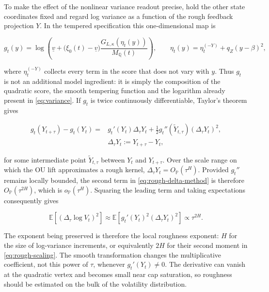 \documentclass[11pt,a4paper]{article}
\newcommand{\Pp}{\mathbb{P}}
\newcommand{\Qq}{\mathbb{Q}}
\newcommand{\E}{\mathbb{E}}
\begin{document}
To make the effect of the nonlinear variance readout precise, hold the other state coordinates
fixed and regard log variance as a function of the rough feedback projection \(Y\).  In the
tempered specification this one-dimensional map is

\begin{equation*}
g_t(y)
=\log\!\left(\underline v+
\bigl(\xi_0(t)-\underline v\bigr)
\frac{G_{L,\kappa}(\eta_t(y))}{M_{\Qq}(t)}\right),
\qquad
\eta_t(y)=\eta_t^{(-Y)}+q_Z(y-\beta)^2,
\end{equation*}

where \(\eta_t^{(-Y)}\) collects every term in the score that does not vary with \(y\).
Thus \(g_t\) is not an additional model ingredient: it is simply the composition of the
quadratic score, the smooth tempering function and the logarithm already present in
\cref{eq:variance}.  If \(g_t\) is twice continuously differentiable, Taylor's theorem gives

\begin{equation}
\begin{split}
g_t(Y_{t+\tau})-g_t(Y_t)
={}&g_t'(Y_t)\Delta_\tau Y_t
+\frac12g_t''(\widetilde Y_{t,\tau})(\Delta_\tau Y_t)^2,\\
&\Delta_\tau Y_t:=Y_{t+\tau}-Y_t,
\end{split}
\label{eq:rough-delta-method}
\end{equation}

for some intermediate point \(\widetilde Y_{t,\tau}\) between \(Y_t\) and \(Y_{t+\tau}\).
Over the scale range on which the OU lift approximates a rough kernel,
\(\Delta_\tau Y_t=O_{\Pp}(\tau^H)\).  Provided \(g_t''\) remains locally bounded, the second
term in \cref{eq:rough-delta-method} is therefore \(O_{\Pp}(\tau^{2H})\), which is
\(o_{\Pp}(\tau^H)\).  Squaring the leading term and taking expectations consequently gives

\begin{equation*}
\E\!\left[(\Delta_\tau\log V_t)^2\right]
\approx \E\!\left[g_t'(Y_t)^2(\Delta_\tau Y_t)^2\right]
\propto \tau^{2H}.
\end{equation*}

The exponent being preserved is therefore the local roughness exponent: \(H\) for the size of
log-variance increments, or equivalently \(2H\) for their second moment in
\cref{eq:rough-scaling}.  The smooth transformation changes the multiplicative coefficient,
not this power of \(\tau\), whenever \(g_t'(Y_t)\neq0\).  The derivative can vanish at the
quadratic vertex and becomes small near cap saturation, so roughness should be estimated on the
bulk of the volatility distribution.
\end{document}
